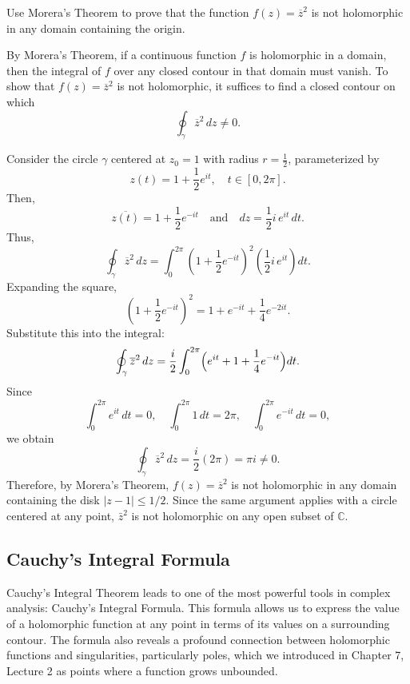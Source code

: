 \exampleline
\begin{example}
Use Morera's Theorem to prove that the function \( f(z)=\overline{z}^2 \) is not holomorphic in any domain containing the origin.

\begin{solution}
By Morera's Theorem, if a continuous function \( f \) is holomorphic in a domain, then the integral of \( f \) over any closed contour in that domain must vanish. To show that \( f(z)=\overline{z}^2 \) is not holomorphic, it suffices to find a closed contour on which
\[
\oint_\gamma \overline{z}^2\,dz \neq 0.
\]

\noindent Consider the circle \(\gamma\) centered at \( z_0=1 \) with radius \( r=\tfrac{1}{2} \), parameterized by
\[
z(t)=1+\frac{1}{2}e^{it},\quad t\in[0,2\pi].
\]
Then,
\[
\overline{z(t)}=1+\frac{1}{2}e^{-it} \quad\text{and}\quad dz=\frac{1}{2}i\,e^{it}\,dt.
\]
Thus,
\[
\oint_\gamma \overline{z}^2\,dz = \int_0^{2\pi} \left(1+\frac{1}{2}e^{-it}\right)^2 \left(\frac{1}{2}i\,e^{it}\right)dt.
\]
Expanding the square,
\[
\left(1+\frac{1}{2}e^{-it}\right)^2 = 1+e^{-it}+\frac{1}{4}e^{-2it}.
\]
Substitute this into the integral:
\[
\oint_\gamma \overline{z}^2\,dz = \frac{i}{2}\int_0^{2\pi} \Bigl(e^{it}+1+\frac{1}{4}e^{-it}\Bigr)dt.
\]
Since
\[
\int_0^{2\pi} e^{it}\,dt=0,\quad \int_0^{2\pi}1\,dt=2\pi,\quad \int_0^{2\pi} e^{-it}\,dt=0,
\]
we obtain
\[
\oint_\gamma \overline{z}^2\,dz = \frac{i}{2}(2\pi)=\pi i\neq 0.
\]
Therefore, by Morera's Theorem, \( f(z)=\overline{z}^2 \) is not holomorphic in any domain containing the disk $|z-1| \leq 1/2$. Since the same argument applies with a circle centered at any point, $\bar{z}^2$ is not holomorphic on any open subset of $\mathbb{C}$.
\end{solution}
\end{example}
\exampleline


\subsection*{Cauchy's Integral Formula} 

\noindent Cauchy's Integral Theorem leads to one of the most powerful tools in complex analysis: Cauchy's Integral Formula. This formula allows us to express the value of a holomorphic function at any point in terms of its values on a surrounding contour. The formula also reveals a profound connection between holomorphic functions and singularities, particularly poles, which we introduced in Chapter 7, Lecture 2 as points where a function grows unbounded. \\


